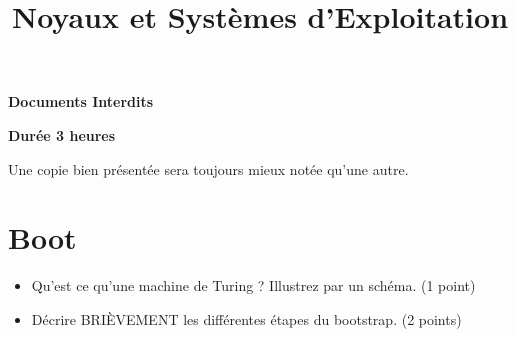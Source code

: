 %
%
%
%
%
%

%
%

%
%

\def\path{../../..}

%
%



%
%

\title{Noyaux et Syst\`emes d'Exploitation}

%
%

\rhead{}

%
%



%
%

\maketitle

%
%

\indentation{}

%
%

\begin{center}

\textbf{Documents Interdits}

\textbf{Dur\'ee 3 heures}

\scriptsize{Une copie bien pr\'esent\'ee sera toujours mieux not\'ee
            qu'une autre.}

\end{center}

%
%

%
%

\section{{Boot}
         {\hfill{} }}

\begin{itemize}
  \item Qu'est ce qu'une machine de Turing ? Illustrez par un schéma. (1 point)
  \item Décrire BRIÈVEMENT les différentes étapes du bootstrap. (2 points)
\end{itemize}

